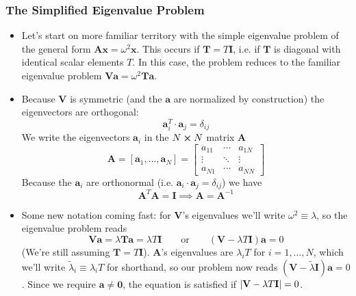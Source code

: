 \documentclass[11pt, a4paper]{article}
\newcommand{\eqtext}[1]{\qquad \text{#1} \qquad}
\newcommand{\mat}[1]{\mathbf{#1}}
\begin{document}
\subsubsection{The Simplified Eigenvalue Problem}
\begin{itemize}
	\item Let's start on more familiar territory with the simple eigenvalue problem of the general form $  \mat{A} \bm{x} = \omega^{2} \bm{x}  $. This occurs if $ \mat{T} = T \mat{I} $, i.e. if $ \mat{T} $ is diagonal with identical scalar elements $ T $. In this case, the problem reduces to the familiar eigenvalue problem $ \mat{V} \bm{a} = \omega^{2} \mat{T} \bm{a} $.
	
	\item Because $ \bm{V} $ is symmetric (and the $ \mat{a} $ are normalized by construction) the eigenvectors are orthogonal:
	\begin{equation*}
		\bm{a}_{i}^{T} \cdot \bm{a}_{j} = \delta_{ij}
	\end{equation*}
	We write the eigenvectors $ \bm{a}_{i} $ in the $ N \cross N $ matrix $ \mat{A} $ 
	\begin{equation*}
		\mat{A} = [\bm{a}_{1}, \ldots, \bm{a}_{N}] =
		\begin{bmatrix}
			a_{11} & \cdots & a_{1N}\\
			\vdots & \ddots & \vdots\\
			a_{N1} & \cdots & a_{NN}
		\end{bmatrix}
	\end{equation*}
	Because the $ \bm{a}_{i} $ are orthonormal (i.e. $ \bm{a}_{i} \cdot \bm{a}_{j} = \delta_{ij} $) we have
	\begin{equation*}
		\mat{A}^{T} \mat{A} = \mat{I} \implies \mat{A} = \mat{A}^{-1}
	\end{equation*}
	
	\item Some new notation coming fast: for $ \mat{V} $'s eigenvalues we'll write $ \omega^{2} \equiv \lambda $, so the eigenvalue problem reads 
	\begin{equation*}
		\mat{V} \bm{a} = \lambda \mat{T} \bm{a} = \lambda T \mat{I}
		\eqtext{or} (\mat{V} - \lambda T \mat{I}) \bm{a} = 0
	\end{equation*}
	(We're still assuming $ \mat{T} = T \mat{I} $). $ \mat{A} $'s eigenvalues are $ \lambda_{i}T $ for $ i = 1, \ldots, N $, which we'll write $ \tilde{\lambda}_{i} \equiv \lambda_{i}T $ for shorthand, so our problem now reads $ (\mat{V} - \tilde{\lambda}\mat{I}) \bm{a} = 0 $. 	Since we require $ \bm{a} \neq \bm{0} $, the equation is satisfied if $ \abs{\mat{V} - \lambda T \mat{I}} = 0 $.
	

\end{itemize}
\end{document}

